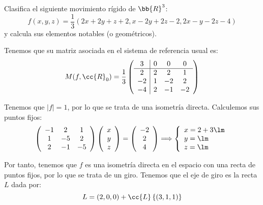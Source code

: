 \begin{ejercicio}
    Clasifica el siguiente movimiento rígido de $\bb{R}^3$:
    \begin{equation*}
        f(x, y, z) = \frac{1}{3}(2x + 2y + z + 2, x - 2y + 2z - 2, 2x - y - 2z - 4)
    \end{equation*}
    y calcula sus elementos notables (o geométricos).

    Tenemos que su matriz asociada en el sistema de referencia usual es:
    \begin{equation*}
        M(f, \cc{R}_0) = \frac{1}{3}\left(
        \begin{array}{c|ccc}
            3 & 0 & 0 & 0 \\ \hline
            2 & 2 & 2 & 1 \\
            -2 & 1 & -2 & 2 \\
            -4 & 2 & -1 & -2
        \end{array}
        \right)
    \end{equation*}

    Tenemos que $|f| = 1$, por lo que se trata de una isometría directa. Calculemos sus puntos fijos:
    \begin{equation*}
        \left(
        \begin{array}{ccc}
            -1 & 2 & 1 \\
            1 & -5 & 2 \\
            2 & -1 & -5
        \end{array}
        \right)
        \left(
        \begin{array}{c}
            x \\ y \\ z
        \end{array}
        \right)
        = \left(
        \begin{array}{c}
            -2 \\ 2 \\ 4
        \end{array}
        \right)
        \Longrightarrow \left\{\begin{array}{l}
            x = 2+3\lm\\
            y = \lm\\
            z = \lm
        \end{array}\right.
    \end{equation*}

    Por tanto, tenemos que $f$ es una isometría directa en el espacio con una recta de puntos fijos, por lo que se trata de un giro. Tenemos que el eje de giro es la recta $L$ dada por:
    \begin{equation*}
        L = (2,0,0) + \cc{L}\left\{(3,1,1)\right\}
    \end{equation*}


\end{ejercicio}
